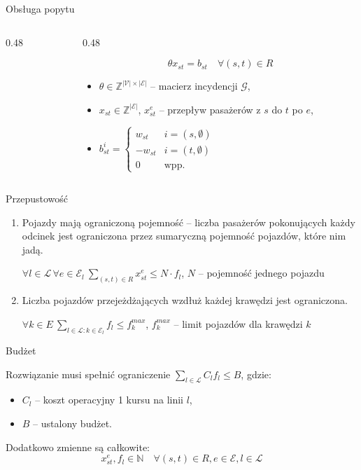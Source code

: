 \documentclass[ignorenonframetext]{beamer}
\newcommand{\formal}[1]{\par{\small\color{black!60}#1}}
\begin{document}
\begin{frame}{Obsługa popytu}
\begin{columns}[T]
\begin{column}{0.48\textwidth}
\begin{tikzpicture}
      \end{tikzpicture}
    \end{column}
    \begin{column}{0.48\textwidth}
      
      \small
      \[\theta x_{st} = b_{st} \quad \forall (s,t) \in R\]
      \begin{itemize}
      \item \(\theta \in \mathbb{Z}^{|\mathcal{V}| \times |\mathcal{E}|}\) -- macierz incydencji \(\mathcal{G}\),
      \item \(x_{st} \in \mathbb{Z}^{|\mathcal{E}|}\), \(x_{st}^{e}\) -- przepływ pasażerów z \(s\) do \(t\) po \(e\),
      \item
        \(
        b_{st}^{i} =
        \begin{cases}
          w_{st} & i = (s, \emptyset)\\
              -w_{st} & i = (t, \emptyset)\\
          0 & \text{wpp.}
        \end{cases}
        \)
      \end{itemize}
    \end{column}
  \end{columns}
\end{frame}
\begin{frame}{Przepustowość}
  \begin{enumerate}
  \item Pojazdy mają ograniczoną pojemność -- liczba pasażerów pokonujących każdy odcinek jest ograniczona przez sumaryczną pojemność pojazdów, które nim jadą.
    \formal{\(\displaystyle \forall l \in \mathcal{L} \, \forall e \in \mathcal{E}_{l} \: \sum_{(s,t) \in R} x_{st}^{e} \le N \cdot f_{l}\), \quad \(N\) -- pojemność jednego pojazdu}
  \item Liczba pojazdów przejeżdżających wzdłuż każdej krawędzi jest ograniczona.
    \formal{\(\displaystyle \forall k \in E \: \sum_{l \in \mathcal{L} : k \in \mathcal{E}_{l}}f_{l} \le f_{k}^{max} \), \quad \(f_{k}^{max}\) -- limit pojazdów dla krawędzi \(k\)
    }
  \end{enumerate}
\end{frame}
\begin{frame}{Budżet}

  Rozwiązanie musi spełnić ograniczenie \(\displaystyle \sum_{l \in \mathcal{L}} C_{l}f_{l} \le B\), gdzie:
  \begin{itemize}
  \item \(C_{l}\) -- koszt operacyjny 1 kursu na linii \(l\),
  \item \(B\) -- ustalony budżet.
  \end{itemize}

  Dodatkowo zmienne są całkowite:
  \[
    x_{st}^{e},f_{l} \in \mathbb{N} \quad \forall (s, t) \in R, e \in \mathcal{E}, l \in \mathcal{L} 
  \]
\end{frame}
\end{document}
